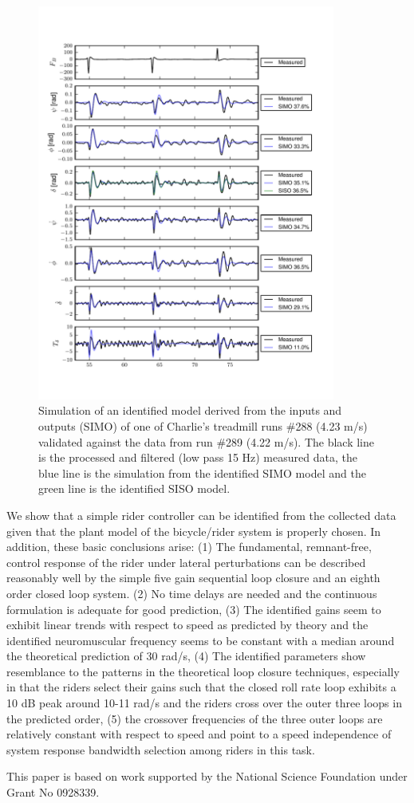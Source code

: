 \documentclass{article}
\begin{document}
\begin{figure}[htb]
  \centering
  \includegraphics[width=3.85in]{rider-id-treadmill-run.pdf}
  \caption{Simulation of an identified model derived from the inputs and
  outputs (SIMO) of one of Charlie's treadmill runs \#288 (4.23 m/s) validated
  against the data from run \#289 (4.22 m/s). The black line is the processed
  and filtered (low pass 15 Hz) measured data, the blue line is the simulation
  from the identified SIMO model and the green line is the identified SISO
  model.}
  \label{fig}
\end{figure}

We show that a simple rider controller can be identified from the collected
data given that the plant model of the bicycle/rider system is properly chosen.
In addition, these basic conclusions arise: (1) The fundamental, remnant-free,
control response of the rider under lateral perturbations can be described
reasonably well by the simple five gain sequential loop closure and an eighth
order closed loop system. (2) No time delays are needed and the continuous
formulation is adequate for good prediction, (3) The identified gains seem to
exhibit linear trends with respect to speed as predicted by theory and the
identified neuromuscular frequency seems to be constant with a median around
the theoretical prediction of 30 rad/s, (4) The identified parameters show
resemblance to the patterns in the theoretical loop closure techniques,
especially in that the riders select their gains such that the closed roll rate
loop exhibits a 10 dB peak around 10-11 rad/s and the riders cross over the
outer three loops in the predicted order, (5) the crossover frequencies of the
three outer loops are relatively constant with respect to speed and point to a
speed independence of system response bandwidth selection among riders in this
task.

This paper is based on work supported by the National Science Foundation under
Grant No 0928339.



\end{document}
